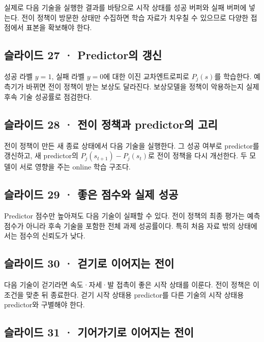 \documentclass[11pt,a4paper]{article}
\begin{document}
실제로 다음 기술을 실행한 결과를 바탕으로 시작 상태를 성공 버퍼와 실패 버퍼에 넣는다. 전이 정책이 방문한 상태만 수집하면 학습 자료가 치우칠 수 있으므로 다양한 접점에서 표본을 확보해야 한다.\par

\subsection{슬라이드 27 · Predictor의 갱신}

성공 라벨 $y=1$, 실패 라벨 $y=0$에 대한 이진 교차엔트로피로 $P_j(s)$를 학습한다. 예측기가 바뀌면 전이 정책이 받는 보상도 달라진다. 보상모델을 정책이 악용하는지 실제 후속 기술 성공률로 점검한다.\par

\subsection{슬라이드 28 · 전이 정책과 predictor의 고리}

전이 정책이 만든 새 종료 상태에서 다음 기술을 실행한다. 그 성공 여부로 predictor를 갱신하고, 새 predictor의 $P_j(s_{t+1})-P_j(s_t)$로 전이 정책을 다시 개선한다. 두 모델이 서로 영향을 주는 online 학습 구조다.\par

\subsection{슬라이드 29 · 좋은 점수와 실제 성공}

Predictor 점수만 높아져도 다음 기술이 실패할 수 있다. 전이 정책의 최종 평가는 예측 점수가 아니라 후속 기술을 포함한 전체 과제 성공률이다. 특히 처음 자료 밖의 상태에서는 점수의 신뢰도가 낮다.\par

\subsection{슬라이드 30 · 걷기로 이어지는 전이}

다음 기술이 걷기라면 속도·자세·발 접촉이 좋은 시작 상태를 이룬다. 전이 정책은 이 조건을 맞춘 뒤 종료한다. 걷기 시작 상태용 predictor를 다른 기술의 시작 상태용 predictor와 구별해야 한다.\par

\subsection{슬라이드 31 · 기어가기로 이어지는 전이}
\end{document}
